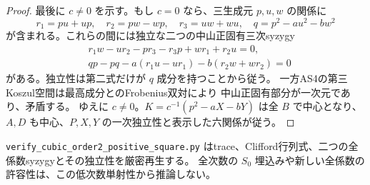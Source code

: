 \begin{proof}
最後に $c\ne0$ を示す。もし $c=0$ なら、三生成元 $p,u,w$ の関係に
\[
 r_1=pu+up,\quad r_2=pw-wp,\quad r_3=uw+wu,\quad
 q=p^2-au^2-bw^2
\]
が含まれる。これらの間には独立な二つの中山正固有三次syzygy
\begin{align*}
 &r_1w-ur_2-pr_3-r_3p+wr_1+r_2u=0,\\
 &qp-pq-a(r_1u-ur_1)-b(r_2w+wr_2)=0
\end{align*}
がある。独立性は第二式だけが $q$ 成分を持つことから従う。
一方AS4の第三Koszul空間は最高成分とのFrobenius双対により
中山正固有部分が一次元であり、矛盾する。
ゆえに $c\ne0$。$K=c^{-1}(p^2-aX-bY)$ は全 $B$ で中心となり、
$A,D$ も中心、$P,X,Y$ の一次独立性と表示した六関係が従う。
\end{proof}
\texttt{verify\_\allowbreak{}cubic\_\allowbreak{}order2\_\allowbreak{}positive\_\allowbreak{}square.py}
はtrace、Clifford行列式、二つの全係数syzygyとその独立性を厳密再生する。
全次数の $S_0$ 埋込みや新しい全係数の許容性は、この低次数単射性から推論しない。

